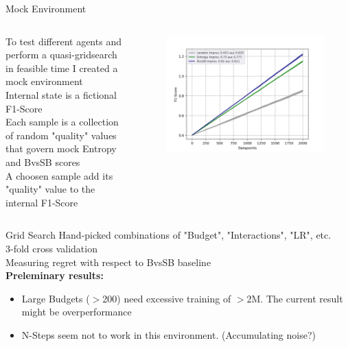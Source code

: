 \documentclass[aspectratio=169, 11pt, invertlogo]{ismll-slides}
\begin{document}


\begin{frame}[fragile]{Mock Environment}
	\begin{columns}
		\begin{column}{.6\linewidth}
			To test different agents and perform a quasi-gridsearch in feasible time I created a mock environment \\ [1mm]
			Internal state is a fictional F1-Score \\ [1mm]
			Each sample is a collection of random "quality" values that govern mock Entropy and BvsSB scores \\ [1mm]
			A choosen sample add its "quality" value to the internal F1-Score 
		\end{column}
		\begin{column}{.4\linewidth}
			\begin{figure}
				\centering
				\includegraphics[width=\linewidth]{pics/eval_mock}
			\end{figure}
		\end{column}
	\end{columns}
\end{frame}




\begin{frame}[fragile]{Grid Search}
	Hand-picked combinations of "Budget", "Interactions", "LR", etc. \\ [1mm]
	3-fold cross validation \\ [1mm]
	Measuring regret with respect to BvsSB baseline \\ [1mm]
	\textbf{Preleminary results:}
	\begin{itemize}
		\item Large Budgets ($>$200) need excessive training of $>$2M. The current result might be overperformance
		\item N-Steps seem not to work in this environment. (Accumulating noise?)
		
	\end{itemize}
\end{frame}
\end{document}
